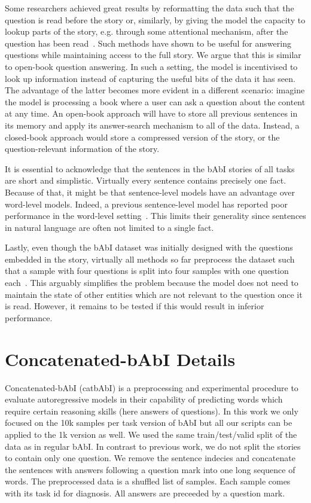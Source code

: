 \documentclass{article} \usepackage{iclr2021_conference,times}
\begin{document}
Some researchers achieved great results by reformatting the data such that the question is read before the story or, similarly, by giving the model the capacity to lookup parts of the story, e.g. through some attentional mechanism, after the question has been read~\citep{sukhbaatar2015end,xiong2016dynamic,dehghani2018universal}.
Such methods have shown to be useful for answering questions while maintaining access to the full story.
We argue that this is similar to open-book question answering.
In such a setting, the model is incentivised to look up information instead of capturing the useful bits of the data it has seen. 
The advantage of the latter becomes more evident in a different scenario: imagine the model is processing a book where a user can ask a question about the content at any time.
An open-book approach will have to store all previous sentences in its memory and apply its answer-search mechanism to all of the data. 
Instead, a closed-book approach would store a compressed version of the story, or the question-relevant information of the story.

It is essential to acknowledge that the sentences in the bAbI stories of all tasks are short and simplistic.
Virtually every sentence contains precisely one fact. 
Because of that, it might be that sentence-level models have an advantage over word-level models.
Indeed, a previous sentence-level model has reported poor performance in the word-level setting~\citep{schlag2018nips}.
This limits their generality since sentences in natural language are often not limited to a single fact.

Lastly, even though the bAbI dataset was initially designed with the questions embedded in the story, virtually all methods so far preprocess the dataset such that a sample with four questions is split into four samples with one question each~\citep{weston2015memorynets}.
This arguably simplifies the problem because the model does not need to maintain the state of other entities which are not relevant to the question once it is read. However, it remains to be tested if this would result in inferior performance.

\section{Concatenated-bAbI Details}
\label{appendix:sec:catbAbI}
Concatenated-bAbI (catbAbI) is a preprocessing and experimental procedure to evaluate autoregressive models in their capability of predicting words which require certain reasoning skills (here answers of questions). 
In this work we only focused on the 10k samples per task version of bAbI but all our scripts can be applied to the 1k version as well. 
We used the same train/test/valid split of the data as in regular bAbI. 
In contrast to previous work, we do not split the stories to contain only one question.
We remove the sentence indecies and concatenate the sentences with answers following a question mark into one long sequence of words. The preprocessed data is a shuffled list of samples. Each sample comes with its task id for diagnosis. All answers are preceeded by a question mark.
\end{document}
